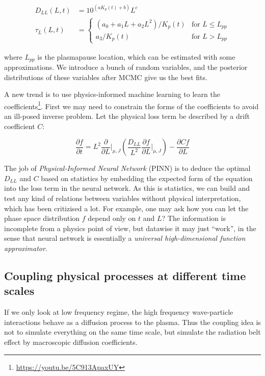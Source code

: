\documentclass[
  notoc %
]{tufte-book}
\DeclareRobustCommand{\href}[2]{#2\footnote{\url{#1}}}
\begin{document}
\[
\begin{aligned}
D_{LL}(L, t) &= 10^(a K_p(t) + b)L^c \\
\tau_L(L, t) &= \left\{
\begin{array}{lr}
(a_0 + a_1 L + a_2 L^2) / K_p(t) & \text{for } L\le L_{pp} \\ a_3 / K_p(t) & \text{for } L > L_{pp}
\end{array}
\right.
\end{aligned}
\]

where \(L_{pp}\) is the plasmapause location, which can be estimated
with some approximations. We introduce a bunch of random variables, and
the posterior distributions of these variables after MCMC give us the
best fits.

A new trend is to \href{https://youtu.be/5C913ApaxUY}{use
physics-informed machine learning to learn the coefficients}. First we
may need to constrain the forms of the coefficients to avoid an
ill-posed inverse problem. Let the physical loss term be described by a
drift coefficient \(C\):

\[
\frac{\partial f}{\partial t} = L^2 \frac{\partial}{\partial L}\bigg\rvert_{\mu,J}\left( \frac{D_{LL}}{L^2}\frac{\partial f}{\partial L}\bigg\rvert_{\mu,J} \right) - \frac{\partial Cf}{\partial L}
\]

The job of \emph{Physical-Informed Neural Network} (PINN) is to deduce
the optimal \(D_{LL}\) and \(C\) based on statistics by embedding the
expected form of the equation into the loss term in the neural network.
As this is statistics, we can build and test any kind of relations
between variables without physical interpretation, which has been
critizised a lot. For example, one may ask how you can let the phase
space distribution \(f\) depend only on \(t\) and \(L\)? The information
is incomplete from a physics point of view, but datawise it may just
``work'', in the sense that neural network is essentially a
\emph{universal high-dimensional function approximator}.

\hypertarget{coupling-physical-processes-at-different-time-scales}{%
\subsection{Coupling physical processes at different time
scales}\label{coupling-physical-processes-at-different-time-scales}}

If we only look at low frequency regime, the high frequency
wave-particle interactions behave as a diffusion process to the plasma.
Thus the coupling idea is not to simulate everything on the same time
scale, but simulate the radiation belt effect by macroscopic diffusion
coefficients.
\end{document}
